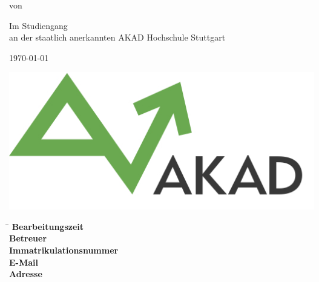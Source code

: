\begin{titlepage}
\begin{center}
\thispagestyle{empty}

\Large{\textbf{\varTitle}}
\vspace{1cm}
\onehalfspacing

\large{\varType}

\vspace{1cm}
\normalsize

von

\vspace{.5cm} 
\large{\varAuthor}
\normalsize
\vspace{1cm}

Im Studiengang \varCourse \\
an der staatlich anerkannten AKAD Hochschule Stuttgart
\vspace{2cm}

\today

\vspace{2cm}

\includegraphics[scale=0.35]{akad_logo.png}

\end{center}

\vfill
\begin{spacing}{1.2}
    \begin{tabbing}
        \hspace{9cm} \= \kill
	\textbf{Bearbeitungszeit} \> \varTime \\
	\textbf{Betreuer} \> \varSupervisor \\
	\textbf{Immatrikulationsnummer} \> \varMatriculation \\
	\textbf{E-Mail} \> \href{mailto:\varMail}{\varMail} \\
	\textbf{Adresse} \> \varStreet \\
            \> \varCity
    \end{tabbing}
\end{spacing}
\restoregeometry
\end{titlepage}